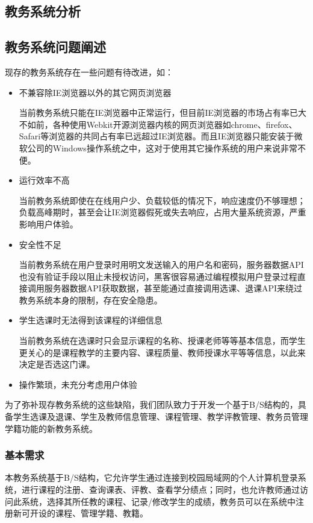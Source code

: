\begin{center}
  \section{教务系统分析}
\end{center}


\subsection{教务系统问题阐述}
现存的教务系统存在一些问题有待改进，如：

\begin{itemize}
  \item 不兼容除IE浏览器以外的其它网页浏览器
  
  \CJKindent 当前教务系统只能在IE浏览器中正常运行，但目前IE浏览器的市场占有率已大不如前，各种使用Webkit开源浏览器内核的网页浏览器如chrome、firefox、Safari等浏览器的共同占有率已远超过IE浏览器。而且IE浏览器只能安装于微软公司的Windows操作系统\texttrademark 之中，这对于使用其它操作系统的用户来说非常不便。
  
  \item 运行效率不高
  
  \CJKindent 当前教务系统即使在在线用户少、负载较低的情况下，响应速度仍不够理想；负载高峰期时，甚至会让IE浏览器假死或失去响应，占用大量系统资源，严重影响用户体验。
  
  \item 安全性不足
  
  \CJKindent 当前教务系统在用户登录时用明文发送输入的用户名和密码，服务器数据API也没有验证手段以阻止未授权访问，黑客很容易通过编程模拟用户登录过程直接调用服务器数据API获取数据，甚至能通过直接调用选课、退课API来绕过教务系统本身的限制，存在安全隐患。
  
  \item 学生选课时无法得到该课程的详细信息
  
  \CJKindent 当前教务系统在选课时只会显示课程的名称、授课老师等等基本信息，而学生更关心的是课程教学的主要内容、课程质量、教师授课水平等等信息，以此来决定是否选这门课。
  
  \item 操作繁琐，未充分考虑用户体验
\end{itemize}

为了弥补现存教务系统的这些缺陷，我们团队致力于开发一个基于B/S结构的，具备学生选课及退课、学生及教师信息管理、课程管理、教学评教管理、教务员管理学籍功能的新教务系统。

\subsubsection{基本需求}
本教务系统基于B/S结构，它允许学生通过连接到校园局域网的个人计算机登录系统，进行课程的注册、查询课表、评教、查看学分绩点；同时，也允许教师通过访问此系统，选择其所任教的课程、记录/修改学生的成绩，教务员可以在系统中注册新可开设的课程、管理学籍、教籍。

